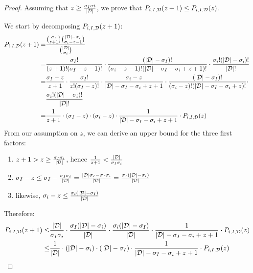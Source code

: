 \begin{proof}
  Assuming that $z \geq \frac{\sigma_{I}\sigma{i}}{|{\cal D}|}$,
  we prove that
  $P_{i,I,{\cal D}}(z+1) \leq P_{i,I,{\cal D}}(z)$.

  We start by decomposing $P_{i,I,{\cal D}}(z+1)$:
  \begin{align*}
    P_{i,I,{\cal D}}(z+1) = & \frac{ \binom{\sigma_{I}}{z+1} \binom{|{\cal D}| - \sigma_{I}}{\sigma_{i}-z-1} }
                                   { \binom{|{\cal D}|}{\sigma_{i}} }  \\
                        = & \frac{\sigma_I!}{(z+1)!(\sigma_I -z-1)!}\cdot
                            \frac{(|{\cal D}|-\sigma_I)!}
                                {(\sigma_i - z -1)!(|{\cal D}|-\sigma_I -\sigma_i +z + 1)!}\cdot
                            \frac{\sigma_i!(|{\cal D}|-\sigma_i)!}{|{\cal D}|!}\\
                        = & \frac{\sigma_I - z}{z+1}\cdot
                            \frac{\sigma_I!}{z!(\sigma_I -z)!}\cdot
                            \frac{\sigma_i - z}{|{\cal D}|-\sigma_I -\sigma_i +z+1}\cdot
                            \frac{(|{\cal D}|-\sigma_I)!}
                                {(\sigma_i - z)!(|{\cal D}|-\sigma_I -\sigma_i +z)!}\cdot \\
                          & \frac{\sigma_i!(|{\cal D}|-\sigma_i)!}{|{\cal D}|!}\\
                        = & \frac{1}{z+1}\cdot (\sigma_I - z) \cdot (\sigma_i - z) \cdot
                            \frac{1}{|{\cal D}|-\sigma_I -\sigma_i +z+1}\cdot
                            P_{i,I,{\cal D}}(z)
  \end{align*}
  From our assumption on $z$, we can derive an upper bound for the three first factors:
  \begin{enumerate}
    \item $z+1 > z \geq \frac{\sigma_I \sigma_i}{|{\cal D}|}$,
      hence $\frac{1}{z+1} < \frac{|{\cal D}|}{\sigma_I \sigma_i}$

    \item $\sigma_I - z \leq \sigma_I - \frac{\sigma_I \sigma_i}{|{\cal D}|} =
      \frac{|{\cal D}|\sigma_I - \sigma_I \sigma_i}{|{\cal D}|} =
      \frac{\sigma_I(|{\cal D}| - \sigma_i)}{|{\cal D}|}$

    \item likewise, $\sigma_i - z \leq \frac{\sigma_i(|{\cal D}| - \sigma_I)}{|{\cal D}|}$
  \end{enumerate}

Therefore:
\begin{align*}
  P_{i,I,{\cal D}}(z+1) \leq &
    \frac{|{\cal D}|}{\sigma_I \sigma_i} \cdot
    \frac{\sigma_I(|{\cal D}| - \sigma_i)}{|{\cal D}|} \cdot
    \frac{\sigma_i(|{\cal D}| - \sigma_I)}{|{\cal D}|} \cdot
    \frac{1}{|{\cal D}|-\sigma_I -\sigma_i +z+1} \cdot
    P_{i,I,{\cal D}}(z) \\
  \leq &
    \frac{1}{|{\cal D}|} \cdot
    (|{\cal D}| - \sigma_i) \cdot
    (|{\cal D}| - \sigma_I) \cdot
    \frac{1}{|{\cal D}|-\sigma_I -\sigma_i +z+1} \cdot
    P_{i,I,{\cal D}}(z) \\
\end{align*}


\end{proof}
